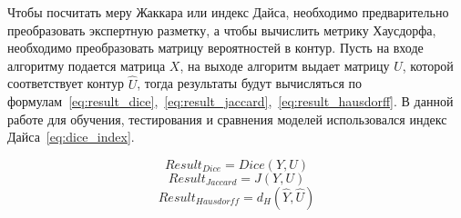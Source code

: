 \clearpage
Чтобы посчитать меру Жаккара или индекс Дайса, необходимо 
предварительно преобразовать экспертную разметку, а чтобы 
вычислить метрику Хаусдорфа, необходимо преобразовать матрицу 
вероятностей в контур. Пусть на входе алгоритму подается 
матрица $X$, на выходе алгоритм выдает матрицу $U$, которой
соответствует контур $\hat{U}$, тогда результаты будут 
вычисляться по формулам~\eqref{eq:result_dice},~\eqref{eq:result_jaccard},~\eqref{eq:result_hausdorff}. В данной работе для обучения, тестирования и сравнения моделей использовался индекс Дайса~\eqref{eq:dice_index}.

\begin{equation}\label{eq:result_dice}
  Result_{Dice} = Dice(Y, U)
\end{equation}
\begin{equation}\label{eq:result_jaccard}
  Result_{Jaccard} = J(Y, U)
\end{equation}
\begin{equation}\label{eq:result_hausdorff}
  Result_{Hausdorff} = d_{H}(\hat{Y}, \hat{U})
\end{equation}
